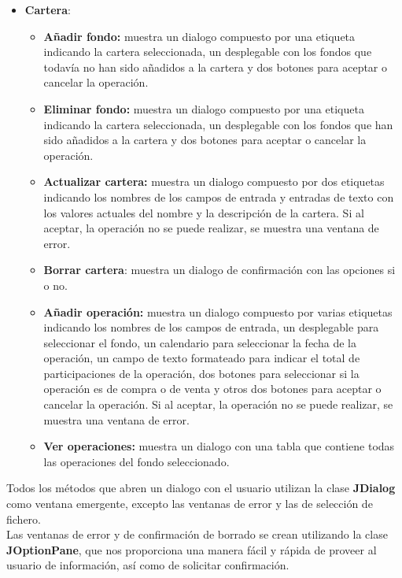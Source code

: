 \documentclass[12pt, a4paper]{article}
\begin{document}
\begin{itemize}
	\item \textbf{Cartera}:
	\begin{itemize}
		\item\textbf{Añadir fondo:} muestra un dialogo compuesto por una etiqueta indicando la cartera seleccionada, un desplegable con los fondos que todavía no han sido añadidos a la cartera y dos botones para aceptar o cancelar la operación.
		\item \textbf{Eliminar fondo:} muestra un dialogo compuesto por una etiqueta indicando la cartera seleccionada, un desplegable con los fondos que han sido añadidos a la cartera y dos botones para aceptar o cancelar la operación.
		\item \textbf{Actualizar cartera:} muestra un dialogo compuesto por dos etiquetas indicando los nombres de  los campos de entrada y entradas de texto con los valores actuales del nombre y la descripción de la cartera. Si al aceptar, la operación no se puede realizar, se muestra una ventana de error.
		\item \textbf{Borrar cartera}: muestra un dialogo de confirmación con las opciones si o no.
		\item \textbf{Añadir operación:} muestra un dialogo compuesto por varias etiquetas indicando los nombres de  los campos de entrada, un desplegable para seleccionar el fondo, un calendario para seleccionar la fecha de la operación, un campo de texto formateado para indicar el total de participaciones de la operación, dos botones para seleccionar si la operación es de compra o de venta y otros dos botones para aceptar o cancelar la operación. Si al aceptar, la operación no se puede realizar, se muestra una ventana de error.
		\item \textbf{Ver operaciones:} muestra un dialogo con una tabla que contiene todas las operaciones del fondo seleccionado.\\
	\end{itemize}
\end{itemize}

Todos los métodos que abren un dialogo con el usuario utilizan la clase \textbf{JDialog} como ventana emergente, excepto las ventanas de error y las de selección de fichero.\\

Las ventanas de error y de confirmación de borrado se crean utilizando la clase \textbf{JOptionPane}, que nos proporciona una manera fácil y rápida de proveer al usuario de información, así como de solicitar confirmación. \\
\end{document}
